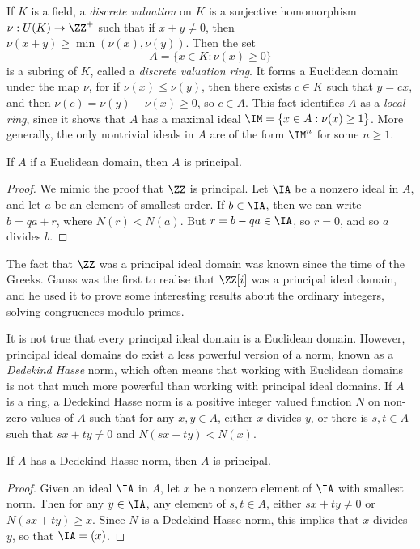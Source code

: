 \begin{example}
    If $K$ is a field, a \emph{discrete valuation} on $K$ is a surjective homomorphism $\nu: U(K) \to \ZZ^+$ such that if $x + y \neq 0$, then $\nu(x + y) \geq \min(\nu(x),\nu(y))$. Then the set
    \[ A = \{ x \in K: \nu(x) \geq 0 \} \]
    is a subring of $K$, called a \emph{discrete valuation ring}. It forms a Euclidean domain under the map $\nu$, for if $\nu(x) \leq \nu(y)$, then there exists $c \in K$ such that $y = cx$, and then $\nu(c) = \nu(y) - \nu(x) \geq 0$, so $c \in A$. This fact identifies $A$ as a \emph{local ring}, since it shows that $A$ has a maximal ideal $\IM = \{ x \in A: \nu(x) \geq 1 \}$. More generally, the only nontrivial ideals in $A$ are of the form $\IM^n$ for some $n \geq 1$.
\end{example}

\begin{theorem}
    If $A$ if a Euclidean domain, then $A$ is principal.
\end{theorem}
\begin{proof}
    We mimic the proof that $\ZZ$ is principal. Let $\IA$ be a nonzero ideal in $A$, and let $a$ be an element of smallest order. If $b \in \IA$, then we can write $b = qa + r$, where $N(r) < N(a)$. But $r = b - qa \in \IA$, so $r = 0$, and so $a$ divides $b$.
\end{proof}

The fact that $\ZZ$ was a principal ideal domain was known since the time of the Greeks. Gauss was the first to realise that $\ZZ[i]$ was a principal ideal domain, and he used it to prove some interesting results about the ordinary integers, solving congruences modulo primes.

It is not true that every principal ideal domain is a Euclidean domain. However, principal ideal domains do exist a less powerful version of a norm, known as a \emph{Dedekind Hasse} norm, which often means that working with Euclidean domains is not that much more powerful than working with principal ideal domains. If $A$ is a ring, a Dedekind Hasse norm is a positive integer valued function $N$ on non-zero values of $A$ such that for any $x,y \in A$, either $x$ divides $y$, or there is $s,t \in A$ such that $sx + ty \neq 0$ and $N(sx + ty) < N(x)$.

\begin{theorem}
    If $A$ has a Dedekind-Hasse norm, then $A$ is principal.
\end{theorem}
\begin{proof}
    Given an ideal $\IA$ in $A$, let $x$ be a nonzero element of $\IA$ with smallest norm. Then for any $y \in \IA$, any element of $s,t \in A$, either $sx + ty \neq 0$ or $N(sx + ty) \geq x$. Since $N$ is a Dedekind Hasse norm, this implies that $x$ divides $y$, so that $\IA = (x)$.
\end{proof}


